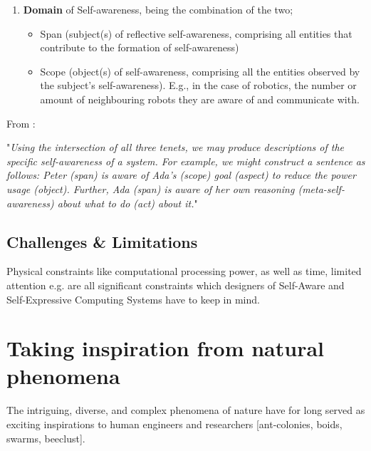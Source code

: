 \begin{enumerate}
		\item \textbf{Domain} of Self-awareness, being the combination of the two;
			\begin{itemize}
				\item Span (subject(s) of reflective self-awareness, comprising all entities that contribute to the formation of self-awareness)
				\item Scope (object(s) of self-awareness, comprising all the entities observed by the subject's self-awareness). E.g., in the case of robotics, the number or amount of neighbouring robots they are aware of and communicate with.
			\end{itemize}
	\end{enumerate}

	From \cite{sacs17_ch3}:

	"\textit{Using the intersection of all three tenets, we may produce descriptions of the
	specific self-awareness of a system. For example, we might construct a sentence as
	follows: Peter (span) is aware of Ada’s (scope) goal (aspect) to reduce the power usage
	(object). Further, Ada (span) is aware of her own reasoning (meta-self-awareness) about what to do (act) about it.}"


	\subsection{Challenges \& Limitations}

	Physical constraints like computational processing power, as well as time, limited attention e.g. are all significant constraints which designers of Self-Aware and Self-Expressive Computing Systems have to keep in mind.




\section{Taking inspiration from natural phenomena}
The intriguing, diverse, and complex phenomena of nature have for long served as exciting inspirations to human engineers and researchers [ant-colonies, boids, swarms, beeclust].

